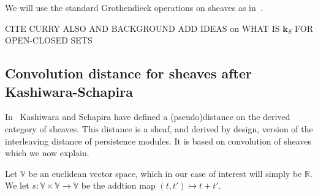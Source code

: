 \documentclass[a4paper, english, 11pt]{article}
\newcommand{\kk}[0]{\textbf{k}}
\newcommand{\0}{\vec{0}}
\newcommand{\R}[0]{\mathbb{R}}
\newcommand{\V}[0]{\mathbb{V}}
\begin{document}
We will use the standard Grothendieck operations on sheaves as in~\cite{Kash90}.  
 
 CITE CURRY ALSO AND BACKGROUND ADD IDEAS on WHAT IS $\kk_S $ FOR OPEN-CLOSED SETS
 
\subsection{Convolution distance for sheaves after Kashiwara-Schapira}
In~\cite{KS18} Kashiwara and Schapira have defined a (pseudo)distance on the derived category of sheaves. This distance is a sheaf, and derived by design, version of the interleaving distance of persistence modules. It is based on convolution of sheaves which we now explain. 

Let  $\V$  be an euclidean vector space, which in our case of interest will simply be $\R$. We let $s: \V\times \V \to \V$ be the addtion map $(t,t')\mapsto t+t'$.  
\end{document}
